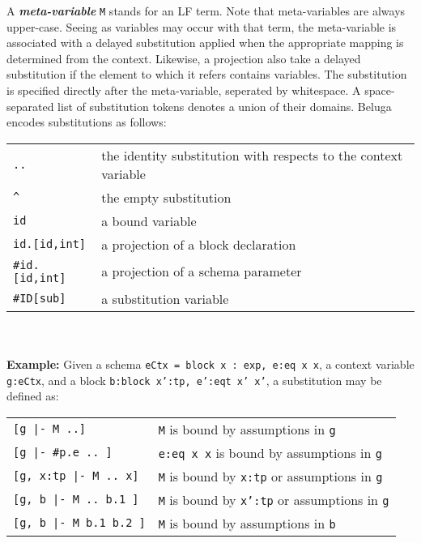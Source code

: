 \documentclass[11pt]{article}
\begin{document}
A \textit{\textbf{meta-variable}} \texttt{M} stands for an LF term. Note that meta-variables are always upper-case. Seeing as variables may occur with that term, the meta-variable is associated with a delayed substitution applied when the appropriate mapping is determined from the context. Likewise, a projection also take a delayed substitution if the element to which it refers contains variables. The substitution is specified directly after the meta-variable, seperated by whitespace. A space-separated list of substitution tokens denotes a union of their domains. Beluga encodes substitutions as follows: \\

\begin{tabular}{ | l l}
\texttt{..} & the identity substitution with respects to the context variable\\
\texttt{\^} & the empty substitution\\
\texttt{id} & a bound variable\\
\texttt{id.[id,int]} & a projection of a block declaration\\
\texttt{\#id.[id,int]} & a projection of a schema parameter\\
\texttt{\#ID[sub]} & a substitution variable\\
\end{tabular}\\
\\

\textbf{Example:} Given a schema \texttt{eCtx = block x : exp, e:eq x x}, a context variable \texttt{g:eCtx}, and a block \texttt{b:block x':tp, e':eqt x' x'}, a substitution may be defined as:

\begin{tabular}{ | l l}
\texttt{[g |- M ..]} & \texttt{M} is bound by assumptions in \texttt{g}\\
\texttt{[g |- \#p.e .. ]} & \texttt{e:eq x x} is bound by assumptions in \texttt{g}\\
\texttt{[g, x:tp |- M .. x]} & \texttt{M} is bound by \texttt{x:tp} or assumptions in \texttt{g} \\
\texttt{[g, b |- M .. b.1 ]} & \texttt{M} is bound by \texttt{x':tp} or assumptions in \texttt{g} \\
\texttt{[g, b |- M b.1 b.2 ]} & \texttt{M} is bound by assumptions in \texttt{b} \\
\end{tabular}



\end{document}
